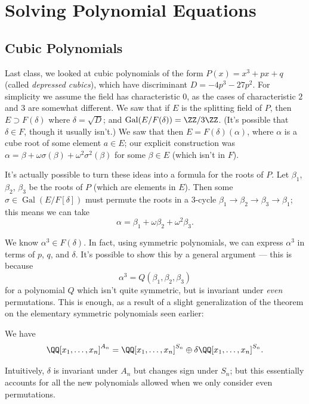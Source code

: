 
\section{Solving Polynomial Equations}

\subsection{Cubic Polynomials}

Last class, we looked at cubic polynomials of the form $P(x) = x^3 + px + q$ (called \emph{depressed cubics}), which have discriminant $D = -4p^3 - 27p^2$. For simplicity we assume the field has characteristic $0$, as the cases of characteristic $2$ and $3$ are somewhat different. We saw that if $E$ is the splitting field of $P$, then $E \supset F(\delta)$ where $\delta = \sqrt{D}$; and $\operatorname{Gal}(E/F(\delta)) = \ZZ/3\ZZ$. (It's possible that $\delta \in F$, though it usually isn't.) We saw that then $E = F(\delta)(\alpha)$, where $\alpha$ is a cube root of some element $a \in E$; our explicit construction was $\alpha = \beta + \omega\sigma(\beta) + \omega^2\sigma^2(\beta)$ for some $\beta \in E$ (which isn't in $F$). 

It's actually possible to turn these ideas into a formula for the roots of $P$. Let $\beta_1$, $\beta_2$, $\beta_3$ be the roots of $P$ (which are elements in $E$). Then some $\sigma \in \operatorname{Gal}(E/F[\delta])$ must permute the roots in a $3$-cycle $\beta_1 \to \beta_2 \to \beta_3 \to \beta_1$; this means we can take \[\alpha = \beta_1 + \omega \beta_2 + \omega^2\beta_3.\] 

We know $\alpha^3 \in F(\delta)$. In fact, using symmetric polynomials, we can express $\alpha^3$ in terms of $p$, $q$, and $\delta$. It's possible to show this by a general argument --- this is because \[\alpha^3 = Q(\beta_1, \beta_2, \beta_3)\] for a polynomial $Q$ which isn't quite symmetric, but is invariant under \emph{even} permutations. This is enough, as a result of a slight generalization of the theorem on the elementary symmetric polynomials seen earlier: 
\begin{fact}
    We have \[\QQ[x_1, \ldots, x_n]^{A_n} = \QQ[x_1, \ldots, x_n]^{S_n} \oplus \delta\QQ[x_1, \ldots, x_n]^{S_n}.\]
\end{fact}
Intuitively, $\delta$ is invariant under $A_n$ but changes sign under $S_n$; but this essentially accounts for all the new polynomials allowed when we only consider even permutations. 

